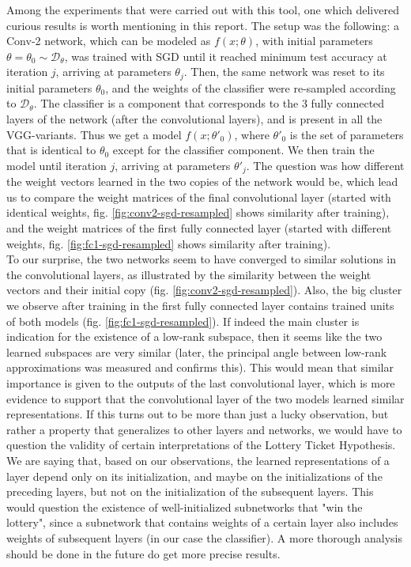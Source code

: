 Among the experiments that were carried out with this tool, one which delivered curious results is worth mentioning in this report. The setup was the following: a Conv-2 network, which can be modeled as $f(x; \theta)$, with initial parameters $\theta = \theta_0 \sim \mathcal{D}_{\theta}$, was trained with SGD until it reached minimum test accuracy at iteration $j$, arriving at parameters $\theta_j$. Then, the same network was reset to its initial parameters $\theta_0$, and the weights of the classifier were re-sampled according to $\mathcal{D}_{\theta}$. The classifier is a component that corresponds to the 3 fully connected layers of the network (after the convolutional layers), and is present in all the VGG-variants. Thus we get a model $f(x; \theta'_0)$, where $\theta'_0$ is the set of parameters that is identical to $\theta_0$ except for the classifier component. We then train the model until iteration $j$, arriving at parameters $\theta'_j$. The question was how different the weight vectors learned in the two copies of the network would be, which lead us to compare the weight matrices of the final convolutional layer (started with identical weights, fig. \ref{fig:conv2-sgd-resampled} shows similarity after training), and the weight matrices of the first fully connected layer (started with different weights, fig. \ref{fig:fc1-sgd-resampled} shows similarity after training). \\

To our surprise, the two networks seem to have converged to similar solutions in the convolutional layers, as illustrated by the similarity between the weight vectors and their initial copy (fig. \ref{fig:conv2-sgd-resampled}). Also, the big cluster we observe after training in the first fully connected layer contains trained units of both models (fig. \ref{fig:fc1-sgd-resampled}). If indeed the main cluster is indication for the existence of a low-rank subspace, then it seems like the two learned subspaces are very similar (later, the principal angle between low-rank approximations was measured and confirms this). This would mean that similar importance is given to the outputs of the last convolutional layer, which is more evidence to support that the convolutional layer of the two models learned similar representations. If this turns out to be more than just a lucky observation, but rather a property that generalizes to other layers and networks, we would have to question the validity of certain interpretations of the Lottery Ticket Hypothesis. We are saying that, based on our observations, the learned representations of a layer depend only on its initialization, and maybe on the initializations of the preceding layers, but not on the initialization of the subsequent layers. This would question the existence of well-initialized subnetworks that "win the lottery", since a subnetwork that contains weights of a certain layer also includes weights of subsequent layers (in our case the classifier). A more thorough analysis should be done in the future do get more precise results.

